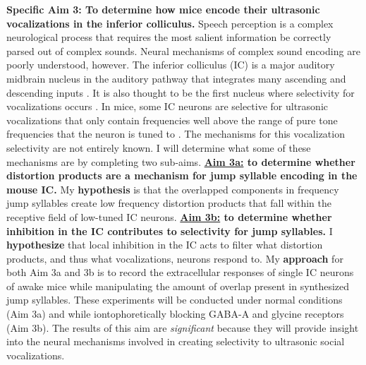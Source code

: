 \documentclass[12pt]{article}
\begin{document}
\textbf{Specific Aim 3: To determine how mice encode their ultrasonic vocalizations in the inferior colliculus.} 
Speech perception is a complex neurological process that requires the most salient information be correctly parsed out of complex sounds. Neural mechanisms of complex sound encoding are poorly understood, however. The inferior colliculus (IC) is a major auditory midbrain nucleus in the auditory pathway that integrates many ascending and descending inputs \cite{Adams79, Saldana96}. It is also thought to be the first nucleus where selectivity for vocalizations occurs \cite{xiediffering2005}. In mice, some IC neurons are selective for ultrasonic vocalizations that only contain frequencies well above the range of pure tone frequencies that the neuron is tuned to \cite{portforsover-representation2009, portforsmismatch2013, holmstromefficient2010}. The mechanisms for this vocalization selectivity are not entirely known. I will determine what some of these mechanisms are by completing two sub-aims. \textbf{\underline{Aim 3a:} to determine whether distortion products are a mechanism for jump syllable encoding in the mouse IC.} My \textbf{hypothesis} is that the overlapped components in frequency jump syllables create low frequency distortion products that fall within the receptive field of low-tuned IC neurons. \textbf{\underline{Aim 3b:} to determine whether inhibition in the IC contributes to selectivity for jump syllables.} I \textbf{hypothesize} that local inhibition in the IC acts to filter what distortion products, and thus what vocalizations, neurons respond to. My \textbf{approach} for both Aim 3a and 3b is to record the extracellular responses of single IC neurons of awake mice while manipulating the amount of overlap present in synthesized jump syllables. These experiments will be conducted under normal conditions (Aim 3a) and while iontophoretically blocking GABA-A and glycine receptors (Aim 3b). The results of this aim are \textit{significant} because they will provide insight into the neural mechanisms involved in creating selectivity to ultrasonic social vocalizations. 
\end{document}
